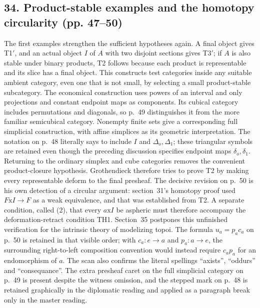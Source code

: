 \documentclass[10pt,oneside]{book}
\begin{document}
\subsection*{34. Product-stable examples and the homotopy circularity (pp. 47--50)}
The first examples strengthen the sufficient hypotheses again. A final object gives T1$'$, and an actual object $I$ of $A$ with two disjoint sections gives T3$'$; if $A$ is also stable under binary products, T2 follows because each product is representable and its slice has a final object. This constructs test categories inside any suitable ambient category, even one that is not small, by selecting a small product-stable subcategory. The economical construction uses powers of an interval and only projections and constant endpoint maps as components. Its cubical category includes permutations and diagonals, so p.~49 distinguishes it from the more familiar semicubical category. Nonempty finite sets give a corresponding full simplicial construction, with affine simplices as its geometric interpretation. The notation on p.~48 literally says to include $I$ and $\Delta_o,\Delta_1$; these triangular symbols are retained even though the preceding discussion specifies endpoint maps $\delta_o,\delta_1$. Returning to the ordinary simplex and cube categories removes the convenient product-closure hypothesis. Grothendieck therefore tries to prove T2 by making every representable deform to the final presheaf. The decisive revision on p.~50 is his own detection of a circular argument: section~31's homotopy proof used $F\mathrm{x}I\to F$ as a weak equivalence, and that was established from T2. A separate condition, called (2), that every $a\mathrm{x}I$ be aspheric must therefore accompany the deformation-retract condition TH1. Section~35 postpones this unfinished verification for the intrinsic theory of modelizing topoi. The formula $u_a=p_a c_a$ on p.~50 is retained in that visible order; with $c_a:e\to a$ and $p_a:a\to e$, the surrounding right-to-left composition convention would instead require $c_a p_a$ for an endomorphism of $a$. The scan also confirms the literal spellings ``axists'', ``oddurs'' and ``consequance''. The extra presheaf caret on the full simplicial category on p.~49 is present despite the witness omission, and the stepped mark on p.~48 is retained graphically in the diplomatic reading and applied as a paragraph break only in the master reading.
\end{document}
